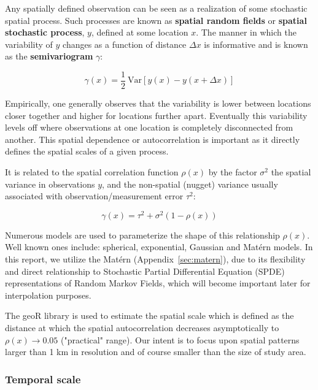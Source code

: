 \documentclass[letterpaper,portrait,11pt]{scrartcl}
\numberwithin{equation}{section}		%
\numberwithin{figure}{section}		%
\numberwithin{table}{section}				%
\begin{document}
Any spatially defined observation can be seen as a realization of some stochastic spatial process. Such  processes are known as \textbf{spatial random fields} or \textbf{spatial stochastic process}, $y$, defined at some location $x$. The manner in which the variability of $y$ changes as a function of distance $\Delta x$ is informative and is known as the \textbf{semivariogram} $\gamma$:

\begin{equation}
\label{eq:semivariogram}
\gamma(x) = \frac{1}{2} \ \textrm{Var} [ y(x) - y(x + \Delta x)]  
\end{equation}

Empirically, one generally observes that the variability is lower between locations closer together and higher for locations further apart. Eventually this variability levels off where observations at one location is completely disconnected from another. This spatial dependence or autocorrelation is important as it directly defines the spatial scales of a given process. 

It is related to the spatial correlation function $\rho(x)$ by the factor $\sigma^2$ the spatial variance in observations $y$, and the non-spatial (nugget) variance usually associated with observation/measurement error $\tau^2$: 

\begin{equation}
  \label{eq:semivariogram_correl}
  \gamma(x) = \tau^2 + \sigma^2 (1- \rho(x) ) 
\end{equation}

Numerous models are used to parameterize the shape of this relationship $\rho(x)$. Well known ones include: spherical, exponential, Gaussian and Mat\'{e}rn models. In this report, we utilize the Mat\'{e}rn (Appendix~\ref{sec:matern}), due to its flexibility and direct relationship to Stochastic Partial Differential Equation (SPDE) representations of Random Markov Fields, which will become important later for interpolation purposes. 

The geoR library is used to estimate the spatial scale which is defined as the distance at which the spatial autocorrelation decreases asymptotically to $\rho(x) \rightarrow 0.05$ ("practical" range). Our intent is to focus upon spatial patterns larger than 1 km in resolution and of course smaller than the size of study area. 

\subsubsection{Temporal scale}
\label{sec:interpolationTS}
\end{document}
